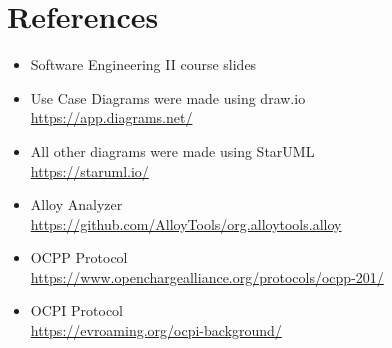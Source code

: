 \section{References}
\begin{itemize}
    \item Software Engineering II course slides
    \item Use Case Diagrams were made using draw.io\\ \url{https://app.diagrams.net/}
    \item All other diagrams were made using StarUML\\ \url{https://staruml.io/}
    \item Alloy Analyzer\\ \url{https://github.com/AlloyTools/org.alloytools.alloy}
    \item OCPP Protocol\\ \url{https://www.openchargealliance.org/protocols/ocpp-201/}
    \item OCPI Protocol\\ \url{https://evroaming.org/ocpi-background/}
\end{itemize}